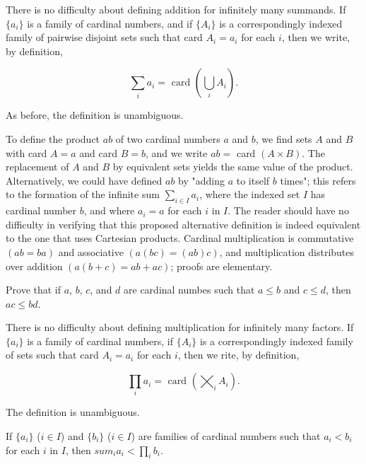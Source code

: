 There is no difficulty about defining addition for infinitely many summands. If $\{ a_{i} \}$ is a family of cardinal numbers, and if $\{ A_{i} \}$ is a correspondingly indexed family of pairwise disjoint sets such that card $A_{i} = a_{i}$ for each $i$, then we write, by definition,

\begin{equation*}
\sum_{i} a_{i} = \text{ card } (\bigcup_{i} A_{i} ).
\end{equation*}

As before, the definition is unambiguous.

To define the product $ab$ of two cardinal numbers $a$ and $b$, we find sets $A$ and $B$ with card $A = a$ and card $B = b$, and we write $ab =$ card $(A \times B)$. The replacement of $A$ and $B$ by equivalent sets yields the same value of the product. Alternatively, we could have defined $ab$ by "adding $a$ to itself $b$ times"; this refers to the formation of the infinite sum $\sum_{i \in I} a_{i}$, where the indexed set $I$ has cardinal number $b$, and where $a_{i} = a$ for each $i$ in $I$. The reader should have no difficulty in verifying that this proposed alternative definition is indeed equivalent to the one that uses Cartesian products. Cardinal multiplication is commutative $(ab = ba)$ and associative $(a(bc) = (ab)c)$, and multiplication distributes over addition $(a(b + c) = ab + ac)$; proofs are elementary. 

\begin{named}[EXERCISE. ] Prove that if $a$, $b$, $c$, and $d$ are cardinal numbes such that $a \le b$ and $c \le d$, then $ac \le bd$.
\end{named}

There is no difficulty about defining multiplication for infinitely many factors. If $\{ a_{i} \}$ is a family of cardinal numbers, if $\{ A_{i} \}$ is a correspondingly indexed family of sets such that card $A_{i} = a_{i}$ for each $i$, then we rite, by definition, 

\begin{equation*}
\prod_{i} a_{i} = \text{ card } ( \bigtimes_{i} A_{i} ).
\end{equation*}

The definition is unambiguous. 

\begin{named}[EXERCISE. ] If $\{ a_{i} \}$ ($i \in I$) and $\{ b_{i} \}$ ($i \in I$) are families of cardinal numbers such that $a_{i} < b_{i}$ for each $i$ in $I$, then $sum_{i}a_{i} < \prod_{i}b_{i}$. 
\end{named}

